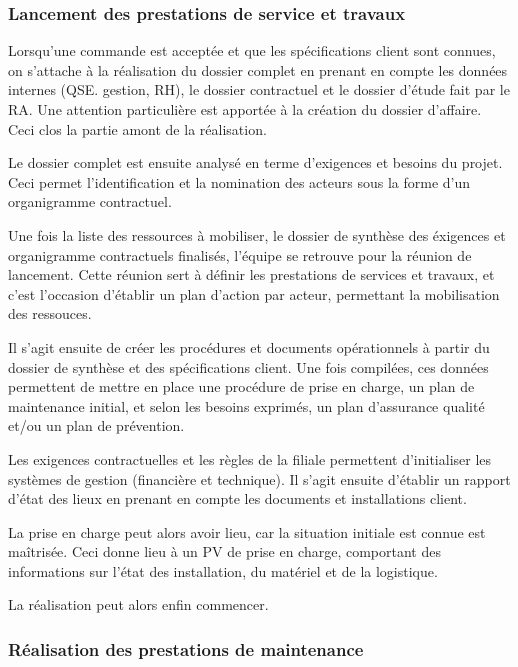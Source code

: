 \subsubsection{Lancement des prestations de service et travaux}

Lorsqu'une commande est acceptée et que les spécifications client sont connues, on s'attache à la réalisation du dossier complet en prenant en compte les données internes (QSE. gestion, RH), le dossier contractuel et le dossier d'étude fait par le RA. Une attention particulière est apportée à la création du dossier d'affaire. Ceci clos la partie amont de la réalisation.

Le dossier complet est ensuite analysé en terme d'exigences et besoins du projet. Ceci permet l'identification et la nomination des acteurs sous la forme d'un organigramme contractuel.

Une fois la liste des ressources à mobiliser, le dossier de synthèse des éxigences et organigramme contractuels finalisés, l'équipe se retrouve pour la réunion de lancement. Cette réunion sert à définir les prestations de services et travaux, et c'est l'occasion d'établir un plan d'action par acteur, permettant la mobilisation des ressouces\footnotemark.


Il s’agit ensuite de créer les procédures et documents opérationnels à partir du dossier de synthèse et des spécifications client. Une fois compilées, ces données permettent de mettre en place une procédure de prise en charge, un plan de maintenance initial, et selon les besoins exprimés, un plan d’assurance qualité et/ou un plan de prévention.

Les exigences contractuelles et les règles de la filiale permettent d'initialiser les systèmes de gestion (financière et technique). Il s'agit ensuite d'établir un rapport d'état des lieux en prenant en compte les documents et installations client.

La prise en charge peut alors avoir lieu, car la situation initiale est connue est maîtrisée. Ceci donne lieu à un PV de prise en charge, comportant des informations sur l'état des installation, du matériel et de la logistique.

La réalisation peut alors enfin commencer.

\subsubsection{Réalisation des prestations de maintenance}

